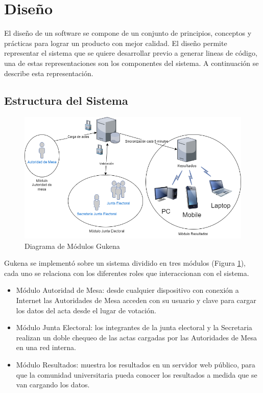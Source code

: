 \section{Diseño}
El diseño de un software se compone de un conjunto de principios, conceptos y prácticas para lograr un producto con mejor calidad. El diseño permite representar el sistema que se quiere desarrollar previo a generar lineas de código, una de estas representaciones son los componentes del sistema. A continuación se describe esta representación. 

\subsection{Estructura del Sistema}
\begin{figure}[h!]
  \includegraphics[width=\textwidth]{img/arquitecturaGukena.png}
  \caption{Diagrama de Módulos Gukena}
  \label{graf:arquitectura}
\end{figure}

Gukena se implementó sobre un sistema dividido en tres módulos (Figura \ref{graf:arquitectura}), cada uno se relaciona con los diferentes roles que interaccionan con el sistema.
\begin{itemize}
\item Módulo Autoridad de Mesa: desde cualquier dispositivo con conexión a Internet las Autoridades de Mesa acceden con su usuario y clave para cargar los datos del acta desde el lugar de votación.
\item Módulo Junta Electoral: los integrantes de la junta electoral y la Secretaria realizan un doble chequeo de las actas cargadas por las Autoridades de Mesa en una red interna.
\item Módulo Resultados: muestra los resultados en un servidor web público, para que la comunidad universitaria pueda conocer los resultados a medida que se van cargando los datos.
\end{itemize}

